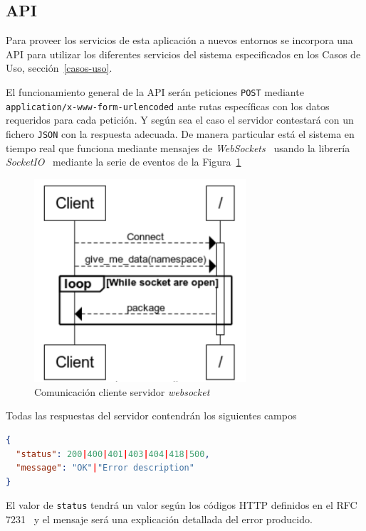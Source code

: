 \subsection{API}
Para proveer los servicios de esta aplicación a nuevos entornos se incorpora una API para utilizar los diferentes servicios del sistema especificados en los Casos de Uso, sección~\ref{casos-uso}.

El funcionamiento general de la API serán peticiones \texttt{POST} mediante \texttt{application/x-www-form-urlencoded} ante rutas específicas con los datos requeridos para cada petición. Y según sea el caso el servidor contestará con un fichero \texttt{JSON} con la respuesta adecuada. De manera particular está el sistema en tiempo real que funciona mediante mensajes de \textit{WebSockets}~\cite{wiki:websocket} usando la librería \textit{SocketIO}~\cite{tool:socketio} mediante la serie de eventos de la Figura~\ref{fig:ws-secuence}

\begin{figure}
	\centering
	\includegraphics[width=0.7\textwidth]{img/ws-secuence.png}
	\caption{Comunicación cliente servidor \textit{websocket}}
	\label{fig:ws-secuence}
\end{figure}

Todas las respuestas del servidor contendrán los siguientes campos
\begin{lstlisting}[language=JSON]
{
  "status": 200|400|401|403|404|418|500,
  "message": "OK"|"Error description"
}
\end{lstlisting}

El valor de \texttt{status} tendrá un valor según los códigos HTTP definidos en el RFC 7231~\cite{RFC7231} y el mensaje será una explicación detallada del error producido.

